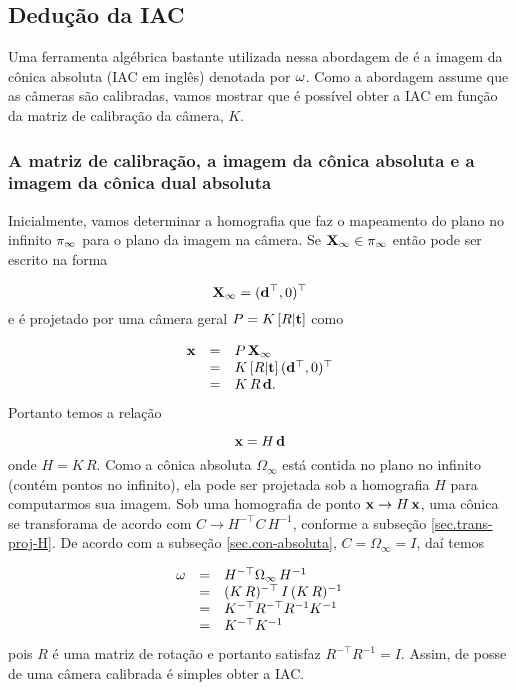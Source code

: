 \subsection{Dedução da IAC}

Uma ferramenta algébrica bastante utilizada nessa abordagem de \citep{2503343} é a imagem da cônica absoluta (IAC em inglês) denotada por ${\bf \omega}$. Como a abordagem assume que as câmeras são calibradas, vamos mostrar que é possível obter a IAC em função da matriz de calibração da câmera, $K$.

\subsubsection{A matriz de calibração, a imagem da cônica absoluta e a imagem da cônica dual absoluta}\label{sec.omega-calibracao}

 Inicialmente, vamos determinar a homografia que faz o mapeamento do plano no infinito $\pi_\infty$ para o plano da imagem na câmera. Se $\mathbf{X}_\infty\in\pi_\infty$ então pode ser escrito na forma

\begin{equation*}
\mathbf{X}_\infty=({\bf d}^\top,0)^\top
\end{equation*} 
e é projetado por uma câmera geral $P=K\,[R|{\bf t}]$ como

\begin{equation*}
\begin{array}{rcl}
\mathbf{x}&=&P\,\mathbf{X}_\infty\\
&=&K\,[R|{\bf t}]\,({\bf d}^\top,0)^\top\\
&=&K\,R\,{\bf d}.
\end{array}
\end{equation*}
Portanto temos a relação

\begin{equation*}
\mathbf{x}=H\,{\bf d}
\end{equation*}
onde $H=K\,R$. Como a cônica absoluta $\Omega_\infty$ está contida no plano no infinito (contém pontos no infinito), ela pode ser projetada sob a homografia $H$ para computarmos sua imagem.
Sob uma homografia de ponto $\mathbf{x}\rightarrow H\,\mathbf{x}$, uma cônica se transforama de acordo com $C\rightarrow H^{-\top} C\,H^{-1}$, conforme a subseção \ref{sec.trans-proj-H}. De acordo com a subseção \ref{sec.con-absoluta}, $C=\Omega_\infty =I$, daí temos

\begin{equation*}
\begin{array}{rcl}
{\bf \omega}&=&H^{-\top}\Omega_\infty\,H^{-1}\\
&=&(K\,R)^{-\top}\,I\,(K\,R)^{-1}\\
&=&K^{-\top}R^{-\top}R^{-1}K^{-1}\\
&=&K^{-\top}K^{-1}
\end{array}
\end{equation*}
pois $R$ é uma matriz de rotação e portanto satisfaz $R^{-\top}R^{-1}=I$. Assim, de posse de uma câmera calibrada é simples obter a IAC.


